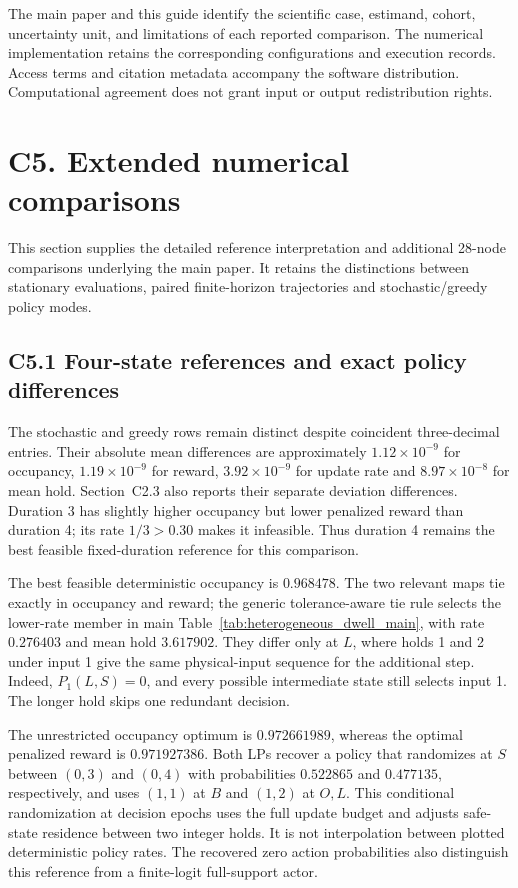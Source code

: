 \documentclass[11pt]{article}
\newcommand{\1}{\mathbf{1}}
\begin{document}
The main paper and this guide identify the scientific case, estimand, cohort, uncertainty unit, and limitations of each reported comparison. The numerical implementation retains the corresponding configurations and execution records. Access terms and citation metadata accompany the software distribution. Computational agreement does not grant input or output redistribution rights.


\section*{C5. Extended numerical comparisons}
\label{comp:sec:extended_comparisons}
This section supplies the detailed reference interpretation and additional 28-node comparisons underlying the main paper. It retains the distinctions between stationary evaluations, paired finite-horizon trajectories and stochastic/greedy policy modes.

\subsection*{C5.1 Four-state references and exact policy differences}
The stochastic and greedy rows remain distinct despite coincident three-decimal entries. Their absolute mean differences are approximately $1.12\times10^{-9}$ for occupancy, $1.19\times10^{-9}$ for reward, $3.92\times10^{-9}$ for update rate and $8.97\times10^{-8}$ for mean hold. Section~C2.3 also reports their separate deviation differences. Duration 3 has slightly higher occupancy but lower penalized reward than duration 4; its rate $1/3>0.30$ makes it infeasible. Thus duration 4 remains the best feasible fixed-duration reference for this comparison.

The best feasible deterministic occupancy is $0.968478$. The two relevant maps tie exactly in occupancy and reward; the generic tolerance-aware tie rule selects the lower-rate member in main Table~\ref*{tab:heterogeneous_dwell_main}, with rate $0.276403$ and mean hold $3.617902$. They differ only at $L$, where holds 1 and 2 under input 1 give the same physical-input sequence for the additional step. Indeed, $P_1(L,S)=0$, and every possible intermediate state still selects input 1. The longer hold skips one redundant decision.

The unrestricted occupancy optimum is $0.972661989$, whereas the optimal penalized reward is $0.971927386$. Both LPs recover a policy that randomizes at $S$ between $(0,3)$ and $(0,4)$ with probabilities $0.522865$ and $0.477135$, respectively, and uses $(1,1)$ at $B$ and $(1,2)$ at $O,L$. This conditional randomization at decision epochs uses the full update budget and adjusts safe-state residence between two integer holds. It is not interpolation between plotted deterministic policy rates. The recovered zero action probabilities also distinguish this reference from a finite-logit full-support actor.
\end{document}
